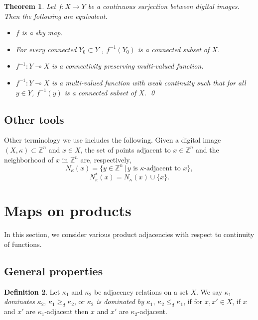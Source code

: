 \documentclass{article}
\theoremstyle{plain}
\newtheorem{thm}{Theorem}
\theoremstyle{definition}
\newtheorem{definition}[thm]{Definition}
\numberwithin{thm}{section}
\def\Z{{\mathbb Z}}
\begin{document}
\begin{thm}
\label{shy-thm}
\rm{\cite{BoxSta16,Boxer16}}
Let $f: X \to Y$ be a 
continuous surjection between digital images.
Then the following are equivalent.
\begin{itemize}
\item $f$ is a shy map.
\item For every connected $Y_0 \subset Y$ , $f^{-1}(Y_0)$
      is a connected subset of $X$.
\item $f^{-1}: Y \multimap X$ is a connectivity preserving multi-valued function.
\item $f^{-1}: Y \multimap X$ is a multi-valued function with weak continuity   
      such that for all $y \in Y$, $f^{-1}(y)$ is a connected subset of $X$. 
      \qed
\end{itemize}
\end{thm}

\subsection{Other tools}
Other terminology we use includes the following.
Given a digital image $(X,\kappa) \subset \Z^n$ and $x \in X$, the set of points adjacent to $x \in \Z^n$ and the
neighborhood of $x$ in $\Z^n$
are, respectively,
\[N_{\kappa}(x) = \{y \in \Z^n \, | \, y \mbox{ is }
    \kappa\mbox{-adjacent to }x\},\]
\[N_{\kappa}^*(x) = N_{\kappa}(x) \cup \{x\}.
\]
\begin{comment}
and
\[ \delta_{\kappa}(X)=\{y \in X \, | \, 
    N_{\kappa}(y) \setminus X \neq \emptyset \}.
\]
\end{comment}

\section{Maps on products}
In this section, we consider various product
adjacencies with respect to continuity of functions.

\subsection{General properties}
\begin{definition}
Let $\kappa_1$ and $\kappa_2$ be adjacency
relations on a set $X$. We say
$\kappa_1$ {\em dominates} $\kappa_2$, $\kappa_1 \ge_d \kappa_2$,
or $\kappa_2$ {\em is dominated by} $\kappa_1$, $\kappa_2 \le_d \kappa_1$,
if for $x,x' \in X$, if $x$ and $x'$ are $\kappa_1$-adjacent then $x$ and $x'$ are $\kappa_2$-adjacent.
\end{definition}
\end{document}
